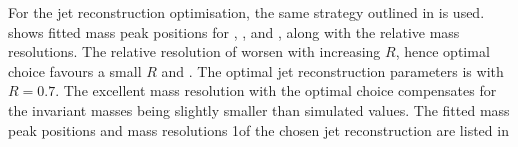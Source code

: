 For the jet reconstruction optimisation, the same strategy outlined in  is used.  shows fitted mass peak positions for \Hbb, \HWW, and \PW, along with the relative mass resolutions. The relative resolution of \PW worsen with increasing $R$, hence optimal choice favours a small $R$ and \tightPFO. The optimal jet reconstruction parameters is  \tightPFO with $R = 0.7$. The excellent mass resolution with the optimal choice compensates for the invariant masses being slightly smaller than simulated values. The fitted mass peak positions and mass resolutions  1of the chosen jet reconstruction are listed in 

